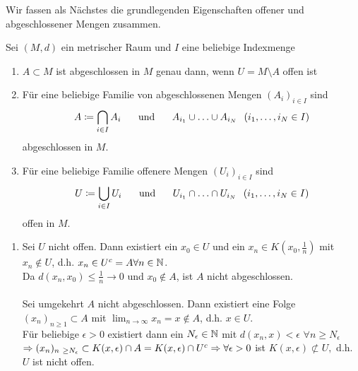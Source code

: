 Wir fassen als Nächstes die grundlegenden Eigenschaften offener und abgeschlossener Mengen zusammen.


\begin{prop}
	Sei $(M, d)$ ein metrischer Raum und $I$ eine beliebige Indexmenge
	\begin{enumerate}[label=\alph*\upshape)]
		\item $A \subset M$ ist abgeschlossen in $M$ genau dann, wenn $U = M \setminus A$ offen ist
		\item Für eine beliebige Familie von abgeschlossenen Mengen $(A_{i})_{i \in I}$ sind 
			\[ A \coloneqq \bigcap_{i \in I} A_{i} \hspace{0.5cm} \text{ und } \hspace{0.5cm} A_{i_{1}} \cup \dotsc \cup A_{i_{N}} \hspace{0.25cm} (i_{1}, \dotsc, i_{N} \in I) \]
			abgeschlossen in $M$.
		\item Für eine beliebige Familie offenere Mengen $(U_{i})_{i \in I}$ sind
			\[ U \coloneqq \bigcup_{i \in I} U_{i} \hspace{0.5cm} \text{ und } \hspace{0.5cm} U_{i_{1}} \cap \dotsc \cap U_{i_{N}} \hspace{0.25cm} (i_{1}, \dotsc, i_{N} \in I) \] 
			offen in $M$.
	\end{enumerate}
	\begin{beweis}
		\begin{enumerate}[label=\alph*\upshape)]
			\item Sei $U$ nicht offen. Dann existiert ein $x_{0} \in U$ und  ein $x_{n} \in K(x_{0}, \frac{1}{n})$ mit $x_{n} \notin U$, d.h. $x_{n} \in U^{c} = A \forall n \in \mathbb{N}$. \\
				Da $d(x_{n}, x_{0}) \leq \frac{1}{n} \rightarrow 0$ und $x_{0} \notin A$, ist $A$ nicht abgeschlossen. \\ \\
				Sei umgekehrt $A$ nicht abgeschlossen. Dann existiert eine Folge $(x_{n})_{n \geq 1} \subset A$ mit $\lim_{n \rightarrow \infty} x_{n} = x \notin A$, d.h. $x \in U$. \\
				Für beliebige $\epsilon > 0$ existiert dann ein $N_{\epsilon} \in \mathbb{N}$ mit $d(x_{n}, x) < \epsilon$  $\forall n \geq N_{\epsilon}$ \\	
				$\Rightarrow (x_{n})_{n \geq N_{\epsilon}} \subset K(x, \epsilon) \cap A = K(x, \epsilon) \cap U^{c} \\
				\Rightarrow \forall \epsilon > 0 $ ist $ K(x, \epsilon) \not\subset U, $ d.h. $U$ ist nicht offen.

\end{enumerate}
\end{beweis}
\end{prop}

